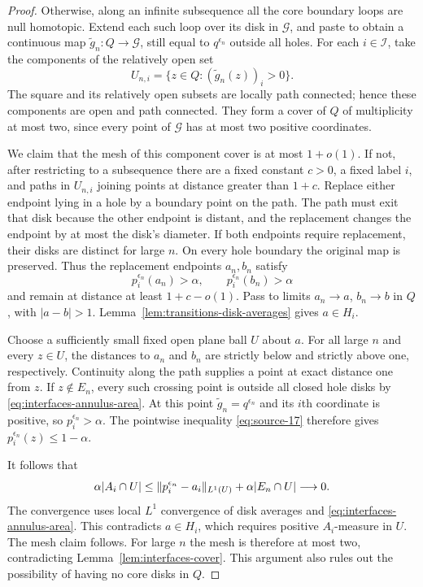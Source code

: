 \begin{proof}
Otherwise, along an infinite subsequence all the core boundary
loops are null homotopic.  Extend each such loop over its disk
in $\mathscr G$, and paste to obtain a continuous map
$\widetilde g_n:Q\to\mathscr G$, still equal to $q^{\epsilon_n}$
outside all holes.  For each $i\in\mathcal I$, take the components
of the relatively open set
\[
 U_{n,i}=\{z\in Q:(\widetilde g_n(z))_i>0\}.
\]
The square and its relatively open subsets are locally path
connected; hence these components are open and path connected.
They form a cover of $Q$ of multiplicity at most two, since every
point of $\mathscr G$ has at most two positive coordinates.

We claim that the mesh of this component cover is at most $1+o(1)$.
If not, after restricting to a subsequence there are a fixed
constant $c>0$, a fixed label $i$, and paths in $U_{n,i}$ joining
points at distance greater than $1+c$.  Replace either endpoint
lying in a hole by a boundary point on the path.  The path must
exit that disk because the other endpoint is distant, and the
replacement changes the endpoint by at most the disk's diameter.
If both endpoints require replacement, their disks are distinct
for large $n$.  On every hole boundary the original map is
preserved.  Thus the replacement endpoints $a_n,b_n$ satisfy
\[
 p_i^{\epsilon_n}(a_n)>\alpha,\qquad
 p_i^{\epsilon_n}(b_n)>\alpha
\]
and remain at distance at least $1+c-o(1)$.  Pass to limits
$a_n\to a$, $b_n\to b$ in $Q$, with $|a-b|>1$.
Lemma~\ref{lem:transitions-disk-averages} gives $a\in H_i$.

Choose a sufficiently small fixed open plane ball $U$ about $a$.
For all large $n$ and every $z\in U$, the distances to $a_n$ and
$b_n$ are strictly below and strictly above one, respectively.
Continuity along the path supplies a point at exact distance one
from $z$.  If $z\notin E_n$, every such crossing point is outside
all closed hole disks by \eqref{eq:interfaces-annulus-area}.
At this point $\widetilde g_n=q^{\epsilon_n}$ and its $i$th
coordinate is positive, so $p_i^{\epsilon_n}>\alpha$.
The pointwise inequality \eqref{eq:source-17} therefore gives
$p_i^{\epsilon_n}(z)\le1-\alpha$.

It follows that
\begin{equation}
 \alpha |A_i\cap U|
 \le
 \lVert p_i^{\epsilon_n}-a_i\rVert_{L^1(U)}
      +\alpha|E_n\cap U|
 \longrightarrow0.
 \label{eq:interfaces-mesh-measure}
\end{equation}
The convergence uses local $L^1$ convergence of disk averages and
\eqref{eq:interfaces-annulus-area}.  This contradicts $a\in H_i$,
which requires positive $A_i$-measure in $U$.  The mesh claim
follows.  For large $n$ the mesh is therefore at most two,
contradicting Lemma~\ref{lem:interfaces-cover}.  This argument also
rules out the possibility of having no core disks in $Q$.
\end{proof}

